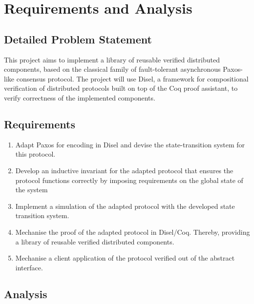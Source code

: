 \chapter{Requirements and Analysis}

\section{Detailed Problem Statement}
This project aims to implement a library of reusable verified distributed components,
based on the classical family of fault-tolerant asynchronous Paxos-like consensus protocol.
The project will use Disel, a framework for compositional verification of distributed
protocols built on top of the Coq proof assistant, to verify correctness of the
implemented components.

\section{Requirements}
\begin{enumerate}
  \item Adapt Paxos for encoding in Disel and devise the state-transition system for this protocol.
  \item Develop an inductive invariant for the adapted protocol that
    ensures the protocol functions correctly by imposing requirements on the global state of the system
  \item Implement a simulation of the adapted protocol with the developed state transition system.
  \item Mechanise the proof of the adapted protocol in Disel/Coq.
    Thereby, providing a library of reusable verified distributed components.
  \item Mechanise a client application of the protocol verified out of the abstract interface.
\end{enumerate}

\section{Analysis}


